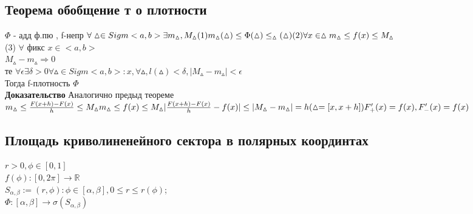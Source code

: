 \documentclass[12pt, a4paper]{article}
\newcommand{\nl}{\newline}
\begin{document}
 \subsection{Теорема обобщение т о плотности} 
    $\Phi$ - адд ф.пю , f-непр
   	$ \forall \vartriangle \in Sigm<a,b> \exists m_\vartriangle ,M_\vartriangle \\
    (1)
    m_\vartriangle(\vartriangle) \leq \Phi(\vartriangle)\leq_\vartriangle(\vartriangle)\\
    (2) \forall x \in \vartriangle m_\vartriangle \leq f(x) \leq  M_\vartriangle$\\
    (3) $\forall$ фикс $x \in <a,b>$\\
    $M_\vartriangle-m_\vartriangle \Rightarrow 0$ \\
    те $\forall \epsilon  \exists \delta > 0  \forall \vartriangle \in Sigm<a,b>: x,  \forall \vartriangle, l(\vartriangle) < \delta  ,          |M_\vartriangle - m_\vartriangle|<\epsilon$ \\
     Тогда f-плотность $\Phi$ \\
    \textbf{Доказательство} \nl
 Аналогично предыд теореме \\
    $m_\vartriangle \leq \frac{F(x+h)-F(x)}{h} \leq M_\vartriangle \\
    m_\vartriangle \leq f(x)\leq M_\vartriangle
    |\frac{F(x+h)-F(x)}{h}-f(x)|\leq |M_\vartriangle-m_\vartriangle| = h (\vartriangle =[x,x+h]) \\
    F_+'(x)=f(x) , F_-'(x)=f(x)$ \\
    
\subsection{Площадь криволиненейного сектора в  полярных координтах}
$r > 0, \phi \in [0,1]$ \\
$f(\phi) : [0,2\pi] \rightarrow \mathbb{R}$\\
$S_{\alpha,\beta}:={(r,\phi) : \phi \in [\alpha,\beta], 0\leq r \leq r(\phi)}$;\\
 $\Phi :[\alpha,\beta]\rightarrow \sigma(S_{\alpha, \beta})$ \\
 
\end{document}
